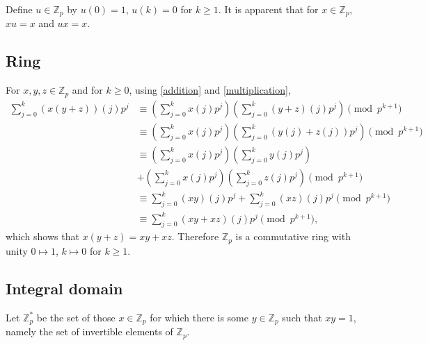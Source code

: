 \documentclass{article}
\theoremstyle{definition}
\theoremstyle{definition}
\begin{document}
Define $u \in \mathbb{Z}_p$ by $u(0)=1$, $u(k)=0$ for $k \geq 1$. It is apparent that for $x \in \mathbb{Z}_p$, $xu=x$
and $ux=x$. 


\subsection{Ring}
For $x,y,z \in \mathbb{Z}_p$ and for $k \geq 0$, using \eqref{addition} and \eqref{multiplication},
\begin{align*}
\sum_{j=0}^k (x(y+z))(j) p^j&\equiv \left( \sum_{j=0}^k x(j) p^j \right)\left( \sum_{j=0}^k (y+z)(j) p^j \right) \pmod{p^{k+1}}\\
&\equiv  \left( \sum_{j=0}^k x(j) p^j \right) \left(\sum_{j=0}^k (y(j)+z(j)) p^j\right) \pmod{p^{k+1}}\\
&\equiv  \left( \sum_{j=0}^k x(j) p^j \right) \left( \sum_{j=0}^k y(j) p^j \right)\\
&+ \left( \sum_{j=0}^k x(j) p^j \right) \left( \sum_{j=0}^k z(j) p^j \right) \pmod{p^{k+1}}\\
&\equiv \sum_{j=0}^k (xy)(j) p^j  + \sum_{j=0}^k (xz)(j) p^j \pmod{p^{k+1}}\\
&\equiv \sum_{j=0}^k (xy+xz)(j) p^j \pmod{p^{k+1}},
\end{align*}
which shows that $x(y+z)=xy+xz$. Therefore $\mathbb{Z}_p$ is a commutative ring with unity
$0 \mapsto 1$, $k \mapsto 0$ for $k \geq 1$. 



\subsection{Integral domain}
Let $\mathbb{Z}_p^*$ be the set of those $x \in \mathbb{Z}_p$ for which there is some $y \in \mathbb{Z}_p$ such that
$xy=1$, namely the set of invertible elements of $\mathbb{Z}_p$. 
\end{document}

